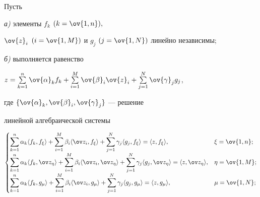 \begin{thm} Пусть





{\em а)} элементы $f_k$ $(k=\ov{1,n}),$


$\ov{z}_i$ $(i=\ov{1,M})$ и $g_j$ $(j=\ov{1,N})$ линейно независимы;





{\em б)} выполняется равенство


$z=\sum\limits_{k=1}^n \ov{\alpha}_k f_k


+\sum\limits_{i=1}^M \ov{\beta}_i \ov{z}_i +


\sum\limits_{j=1}^N \ov{\gamma}_j g_j$,


где $\{\ov{\alpha}_k, \ov{\beta}_i, \ov{\gamma}_j\}$ --- решение


линейной алгебраической системы


\begin{equation}


\begin{cases}


\displaystyle


\sum_{k=1}^n \alpha_k \la f_k,f_\xi\ra 


+ \sum_{i=1}^M \beta_i \la \ov z_i,f_\xi\ra 


+ \sum_{j=1}^N \gamma_j \la g_j,f_\xi\ra =


\la z, f_\xi\ra, & \xi=\ov{1,n};\\


\displaystyle


\sum_{k=1}^n \alpha_k \la f_k,\ov z_\eta\ra 


+ \sum_{i=1}^M \beta_i \la \ov z_i,\ov z_\eta\ra 


+ \sum_{j=1}^N \gamma_j \la g_j,\ov z_\eta\ra =


\la z, \ov z_\eta\ra, & \eta=\ov{1,M};\\


\displaystyle


\sum_{k=1}^n \alpha_k \la f_k,g_\mu\ra 


+ \sum_{i=1}^M \beta_i \la \ov z_i,g_\mu\ra 


+ \sum_{j=1}^N \gamma_j \la g_j,g_\mu\ra =


\la z, g_\mu\ra, & \mu=\ov{1,N};


\end{cases}


\end{equation}






\end{thm}
